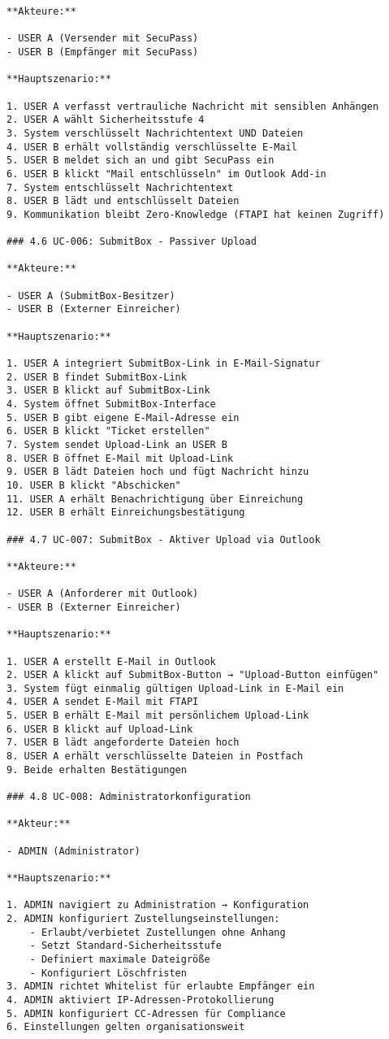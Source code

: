 \begin{verbatim}
**Akteure:**

- USER A (Versender mit SecuPass)
- USER B (Empfänger mit SecuPass)

**Hauptszenario:**

1. USER A verfasst vertrauliche Nachricht mit sensiblen Anhängen
2. USER A wählt Sicherheitsstufe 4
3. System verschlüsselt Nachrichtentext UND Dateien
4. USER B erhält vollständig verschlüsselte E-Mail
5. USER B meldet sich an und gibt SecuPass ein
6. USER B klickt "Mail entschlüsseln" im Outlook Add-in
7. System entschlüsselt Nachrichtentext
8. USER B lädt und entschlüsselt Dateien
9. Kommunikation bleibt Zero-Knowledge (FTAPI hat keinen Zugriff)

### 4.6 UC-006: SubmitBox - Passiver Upload

**Akteure:**

- USER A (SubmitBox-Besitzer)
- USER B (Externer Einreicher)

**Hauptszenario:**

1. USER A integriert SubmitBox-Link in E-Mail-Signatur
2. USER B findet SubmitBox-Link
3. USER B klickt auf SubmitBox-Link
4. System öffnet SubmitBox-Interface
5. USER B gibt eigene E-Mail-Adresse ein
6. USER B klickt "Ticket erstellen"
7. System sendet Upload-Link an USER B
8. USER B öffnet E-Mail mit Upload-Link
9. USER B lädt Dateien hoch und fügt Nachricht hinzu
10. USER B klickt "Abschicken"
11. USER A erhält Benachrichtigung über Einreichung
12. USER B erhält Einreichungsbestätigung

### 4.7 UC-007: SubmitBox - Aktiver Upload via Outlook

**Akteure:**

- USER A (Anforderer mit Outlook)
- USER B (Externer Einreicher)

**Hauptszenario:**

1. USER A erstellt E-Mail in Outlook
2. USER A klickt auf SubmitBox-Button → "Upload-Button einfügen"
3. System fügt einmalig gültigen Upload-Link in E-Mail ein
4. USER A sendet E-Mail mit FTAPI
5. USER B erhält E-Mail mit persönlichem Upload-Link
6. USER B klickt auf Upload-Link
7. USER B lädt angeforderte Dateien hoch
8. USER A erhält verschlüsselte Dateien in Postfach
9. Beide erhalten Bestätigungen

### 4.8 UC-008: Administratorkonfiguration

**Akteur:**

- ADMIN (Administrator)

**Hauptszenario:**

1. ADMIN navigiert zu Administration → Konfiguration
2. ADMIN konfiguriert Zustellungseinstellungen:
    - Erlaubt/verbietet Zustellungen ohne Anhang
    - Setzt Standard-Sicherheitsstufe
    - Definiert maximale Dateigröße
    - Konfiguriert Löschfristen
3. ADMIN richtet Whitelist für erlaubte Empfänger ein
4. ADMIN aktiviert IP-Adressen-Protokollierung
5. ADMIN konfiguriert CC-Adressen für Compliance
6. Einstellungen gelten organisationsweit


\end{verbatim}
